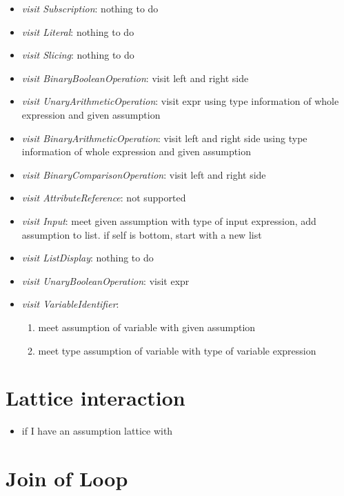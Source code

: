 \documentclass[11pt]{article}
\begin{document}
\begin{itemize}
\item \textit{visit Subscription}: nothing to do
\item \textit{visit Literal}: nothing to do
\item \textit{visit Slicing}: nothing to do
\item \textit{visit BinaryBooleanOperation}: visit left and right side
\item \textit{visit UnaryArithmeticOperation}: visit expr using type information of whole expression and given assumption
\item \textit{visit BinaryArithmeticOperation}: visit left and right side using type information of whole expression and given assumption
\item \textit{visit BinaryComparisonOperation}: visit left and right side
\item \textit{visit AttributeReference}: not supported
\item \textit{visit Input}: meet given assumption with type of input expression, add assumption to list. if self is bottom, start with a new list
\item \textit{visit ListDisplay}: nothing to do
\item \textit{visit UnaryBooleanOperation}: visit expr
\item \textit{visit VariableIdentifier}:
\begin{enumerate}
\item meet assumption of variable with given assumption
\item meet type assumption of variable with type of variable expression
\end{enumerate}
\end{itemize}

\section{Lattice interaction}

\begin{itemize}
\item if I have an assumption lattice with 
\end{itemize}

\section{Join of Loop}
\end{document}
